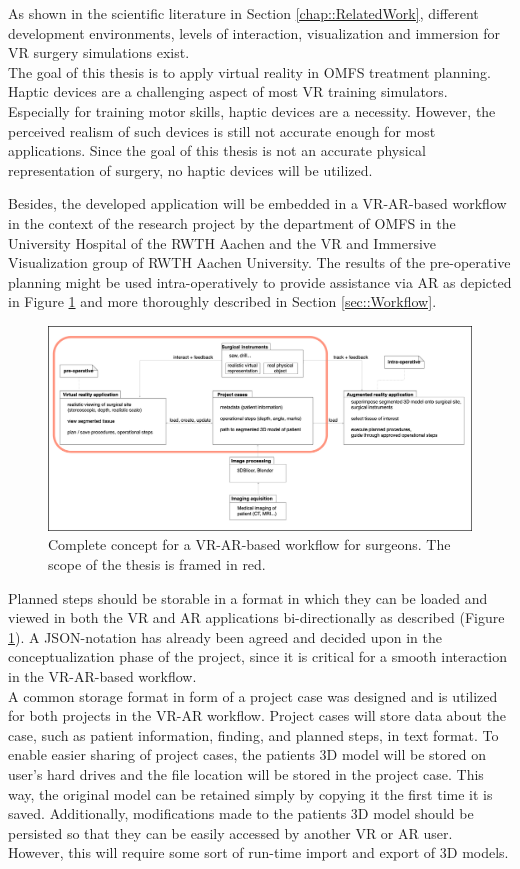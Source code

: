 As shown in the scientific literature in Section \ref{chap::RelatedWork}, different development environments, levels of interaction, visualization and immersion for VR surgery simulations exist.
\\ The goal of this thesis is to apply virtual reality in OMFS treatment planning.
Haptic devices are a challenging aspect of most VR training simulators.
Especially for training motor skills, haptic devices are a necessity.
However, the perceived realism of such devices is still not accurate enough for most applications.
Since the goal of this thesis is not an accurate physical representation of surgery, no haptic devices will be utilized.

Besides, the developed application will be embedded in a VR-AR-based workflow in the context of the research project by the department of OMFS in the University 
Hospital of the RWTH Aachen and the VR and Immersive Visualization group of RWTH Aachen University.
The results of the pre-operative planning might be used intra-operatively to provide assistance via AR as depicted in Figure \ref{fig::ProjectPlan} and more thoroughly described in Section \ref{sec::Workflow}.
\begin{figure}
    \centering
    \includegraphics[width=\linewidth]{images/project_plan.png}
    \caption{\label{fig::ProjectPlan} Complete concept for a VR-AR-based workflow for surgeons. The scope of the thesis is framed in red.}
\end{figure}
Planned steps should be storable in a format in which they can be loaded and viewed in both the VR and AR applications bi-directionally as described (Figure \ref{fig::ProjectPlan}).
A JSON-notation has already been agreed and decided upon in the conceptualization phase of the project, since it is critical for a smooth 
interaction in the VR-AR-based workflow.
\\ A common storage format in form of a project case was designed and is utilized for both projects in the VR-AR workflow.
Project cases will store data about the case, such as patient information, finding, and planned steps, in text format.
To enable easier sharing of project cases, the patients 3D model will be stored on user's hard drives and the file location will be stored in the project case. 
This way, the original model can be retained simply by copying it the first time it is saved.
Additionally, modifications made to the patients 3D model should be persisted so that they can be easily accessed by another VR or AR user. 
However, this will require some sort of run-time import and export of 3D models.


